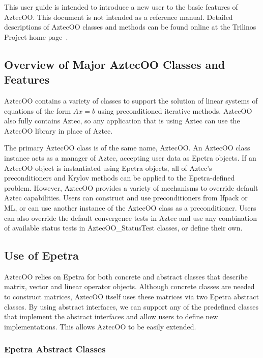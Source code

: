 \documentclass[12pt,relax]{AztecOOUserGuide}
\newcommand{\statustest}{AztecOO\_StatusTest}
\begin{document}
This user guide is intended to introduce a new user to the basic features of AztecOO.
This document is not intended as a reference
manual.  Detailed descriptions of AztecOO classes and methods can be
found online at the Trilinos Project home page~\cite{Trilinos-home-page}.


\subsection{Overview of Major AztecOO Classes and Features}

AztecOO contains a variety of classes to support the solution of
linear systems of equations of the form $Ax=b$ using preconditioned
iterative methods.  AztecOO also fully contains Aztec, so any application
that is using Aztec can use the AztecOO library in place of Aztec.  

The primary AztecOO class is of the same name, AztecOO.  An AztecOO
class instance acts as a manager of Aztec, accepting user data as
Epetra objects.  If an AztecOO object is instantiated using Epetra
objects, all of Aztec's preconditioners and Krylov methods can be
applied to the Epetra-defined problem.  However, AztecOO provides a
variety of mechanisms to override default Aztec capabilities.  Users
can construct and use preconditioners from Ifpack or ML, or can use
another instance of the AztecOO class as a preconditioner.  Users can
also override the default convergence tests in Aztec and use any
combination of available status tests in \statustest{} classes,
or define their own.

\subsection{Use of Epetra}

AztecOO relies on Epetra for both concrete and abstract classes that
describe matrix, vector and linear operator objects.  
Although  concrete classes are needed to construct matrices, AztecOO
itself uses these matrices via two Epetra abstract classes.  By using
abstract interfaces, we can support any of the predefined classes that
implement the abstract interfaces and allow users to define
new implementations.  This allows AztecOO
to be easily extended.  

\subsubsection{Epetra Abstract Classes}
\end{document}
